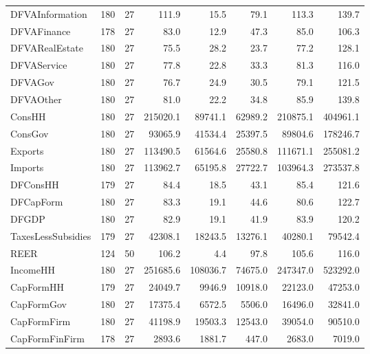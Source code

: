 {\begin{tabular}[t]{lrrrrrrr}
DFVAInformation & 180 & 27 & \num{111.9} & \num{15.5} & \num{79.1} & \num{113.3} & \num{139.7}\\
DFVAFinance & 178 & 27 & \num{83.0} & \num{12.9} & \num{47.3} & \num{85.0} & \num{106.3}\\
DFVARealEstate & 180 & 27 & \num{75.5} & \num{28.2} & \num{23.7} & \num{77.2} & \num{128.1}\\
DFVAService & 180 & 27 & \num{77.8} & \num{22.8} & \num{33.3} & \num{81.3} & \num{116.0}\\
DFVAGov & 180 & 27 & \num{76.7} & \num{24.9} & \num{30.5} & \num{79.1} & \num{121.5}\\
DFVAOther & 180 & 27 & \num{81.0} & \num{22.2} & \num{34.8} & \num{85.9} & \num{139.8}\\
ConsHH & 180 & 27 & \num{215020.1} & \num{89741.1} & \num{62989.2} & \num{210875.1} & \num{404961.1}\\
ConsGov & 180 & 27 & \num{93065.9} & \num{41534.4} & \num{25397.5} & \num{89804.6} & \num{178246.7}\\
Exports & 180 & 27 & \num{113490.5} & \num{61564.6} & \num{25580.8} & \num{111671.1} & \num{255081.2}\\
Imports & 180 & 27 & \num{113962.7} & \num{65195.8} & \num{27722.7} & \num{103964.3} & \num{273537.8}\\
DFConsHH & 179 & 27 & \num{84.4} & \num{18.5} & \num{43.1} & \num{85.4} & \num{121.6}\\
DFCapForm & 180 & 27 & \num{83.3} & \num{19.1} & \num{44.6} & \num{80.6} & \num{122.7}\\
DFGDP & 180 & 27 & \num{82.9} & \num{19.1} & \num{41.9} & \num{83.9} & \num{120.2}\\
TaxesLessSubsidies & 179 & 27 & \num{42308.1} & \num{18243.5} & \num{13276.1} & \num{40280.1} & \num{79542.4}\\
REER & 124 & 50 & \num{106.2} & \num{4.4} & \num{97.8} & \num{105.6} & \num{116.0}\\
IncomeHH & 180 & 27 & \num{251685.6} & \num{108036.7} & \num{74675.0} & \num{247347.0} & \num{523292.0}\\
CapFormHH & 179 & 27 & \num{24049.7} & \num{9946.9} & \num{10918.0} & \num{22123.0} & \num{47253.0}\\
CapFormGov & 180 & 27 & \num{17375.4} & \num{6572.5} & \num{5506.0} & \num{16496.0} & \num{32841.0}\\
CapFormFirm & 180 & 27 & \num{41198.9} & \num{19503.3} & \num{12543.0} & \num{39054.0} & \num{90510.0}\\
CapFormFinFirm & 178 & 27 & \num{2893.6} & \num{1881.7} & \num{447.0} & \num{2683.0} & \num{7019.0}\\

\end{tabular}}
